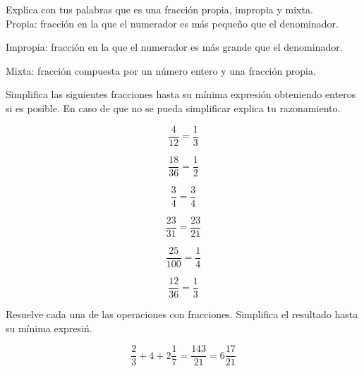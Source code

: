 \documentclass[11pt]{article}
\begin{document}
Explica con tus palabras que es una fracci\'on propia, impropia y mixta.\\

Propia: fracci\'on en la que el numerador es m\'as peque\~no que el denominador.

\vspace{1.5cm}

Impropia: fracci\'on en la que el numerador es m\'as grande que el denominador.

\vspace{1.5cm}

Mixta: fracci\'on compuesta por un n\'umero entero y una fracci\'on propia.

\vspace{1.5cm}


Simplifica las siguientes fracciones hasta su m\'inima expresi\'on obteniendo
enteros si es posible. En caso de que no se pueda simplificar explica tu
razonamiento.

\begin{multicols}{2}

\begin{equation*}    \frac{4}{12}= \frac{1}{3}  \end{equation*}

\begin{equation*}    \frac{18}{36}= \frac{1}{2} \end{equation*}

\begin{equation*}    \frac{3}{4}= \frac{3}{4}   \end{equation*}

\begin{equation*}    \frac{23}{31}= \frac{23}{21} \end{equation*}

\begin{equation*}    \frac{25}{100}= \frac{1}{4} \end{equation*}

\begin{equation*}    \frac{12}{36}= \frac{1}{3} \end{equation*}

\end{multicols}

\vspace{1cm}

Resuelve cada una de las operaciones con fracciones. Simplifica el resultado
hasta su m\'inima expresi\'n.
    

\begin{equation*}
    \frac{2}{3} + 4 + 2 \frac{1}{7}= \frac{143}{21} = 6\frac{17}{21} 
\end{equation*}
\end{document}
